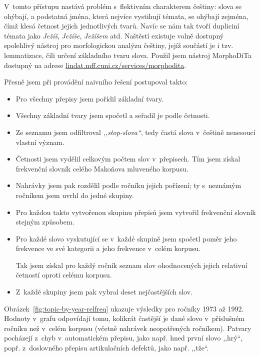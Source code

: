 V~tomto přístupu nastává problém s~flektivním charakterem češtiny: slova se
ohýbají, a podstatná jména, která nejvíce vystihují témata, se ohýbají zejména,
čímž klesá četnost jejich jednotlivých tvarů. Navíc se nám tak tvoří dupliciní
témata jako \textit{Ježíš}, \textit{Ježíše}, \textit{Ježíšem} atd. Naštěstí existuje volně
dostupný spolehlivý nástroj pro morfologickou analýzu češtiny, jejíž součástí je
i tzv. lemmatizace, čili určení základního tvaru slova. Použil jsem nástroj
MorphoDiTa\cite{morphodita} dostupný na adrese
\url{lindat.mff.cuni.cz/services/morphodita}.

Přesně jsem při provádění naivního řešení postupoval takto:
\begin{itemize}
\item{%
Pro všechny přepisy jsem pořídil základní tvary.
}
\item{%
Všechny základní tvary jsem spočetl a seřadil je podle četnosti.
}
\item{%
Ze seznamu jsem odfiltroval \textit{,,stop-slova``}, tedy častá slova v~češtině
nenesoucí vlastní význam.
}
\item{%
Četnosti jsem vydělil celkovým počtem slov v~přepisech. Tím jsem získal
frekvenční slovník celého Makoňova mluveného korpusu.
}
\item{%
Nahrávky jsem pak rozdělil podle ročníku jejich pořízení; ty s~neznámým ročníkem
jsem uvrhl do jedné skupiny.
}
\item{%
Pro každou takto vytvořenou skupinu přepisů jsem vytvořil frekvenční slovník
stejným způsobem.
}
\item{%
Pro každé slovo vyskutující se v~každé skupině jsem spočetl poměr jeho frekvence
ve své kategorii a jeho frekvence v~celém korpusu.

Tak jsem získal pro každý ročník seznam slov ohodnocených jejich relativní
četností oproti celému korpusu.
}
\item{%
Z~každé skupiny jsem pak vybral deset nejčastějších slov.
}
\end{itemize}

Obrázek~\ref{fig:topic-by-year-relfreq} ukazuje výsledky pro ročníky 1973 až 1992.
Hodnoty v~grafu odpovídají tomu, kolikrát častější je dané slovo v~příslušném
ročníku než v~celém korpusu (včetně nahrávek neopatřených ročníkem). Patvary
pocházejí z~chyb v~automatickém přepisu, jako např. hned první slovo ,,hrý``, popř.
z~doslovného přepisu artikulačních defektů, jako např. ,,tže``.

